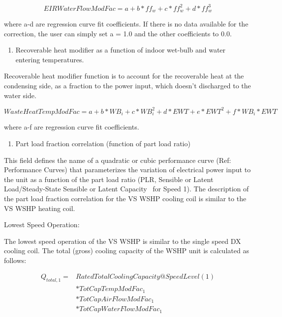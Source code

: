 \begin{equation}
EIRWaterFlowModFac = a + b*f{f_w} + c*ff_w^2 + d*ff_w^3
\end{equation}

where a-d are regression curve fit coefficients.  If there is no data available for the correction, the user can simply set a = 1.0 and the other coefficients to 0.0.

\begin{enumerate}
\def\labelenumi{\arabic{enumi})}
\setcounter{enumi}{6}
\tightlist
\item
  Recoverable heat modifier as a function of indoor wet-bulb and water entering temperatures.
\end{enumerate}

Recoverable heat modifier function is to account for the recoverable heat at the condensing side, as a fraction to the power input, which doesn't discharged to the water side.

\begin{equation}
WasteHeatTempModFac = a + b*W{B_i} + c*WB_i^2 + d*EWT + e*EW{T^2} + f*W{B_i}*EWT
\end{equation}

where a-f are regression curve fit coefficients.

\begin{enumerate}
\def\labelenumi{\arabic{enumi})}
\setcounter{enumi}{7}
\tightlist
\item
  Part load fraction correlation (function of part load ratio)
\end{enumerate}

This field defines the name of a quadratic or cubic performance curve (Ref: Performance Curves) that parameterizes the variation of electrical power input to the unit as a function of the part load ratio (PLR, Sensible or Latent Load/Steady-State Sensible or Latent Capacity~ for Speed 1). The description of the part load fraction correlation for the VS WSHP cooling coil is similar to the VS WSHP heating coil.

Lowest Speed Operation:

The lowest speed operation of the VS WSHP is similar to the single speed DX cooling coil. The total (gross) cooling capacity of the WSHP unit is calculated as follows:

\begin{equation}
 \begin{array}{rl}
  Q_{total,1} =& RatedTotalCoolingCapacity@SpeedLevel\left( 1 \right) \\
              &* TotCapTempModFac_1 \\
              &* TotCapAirFlowModFac_1 \\
              &* TotCapWaterFlowModFac_1
 \end{array}
\end{equation}

